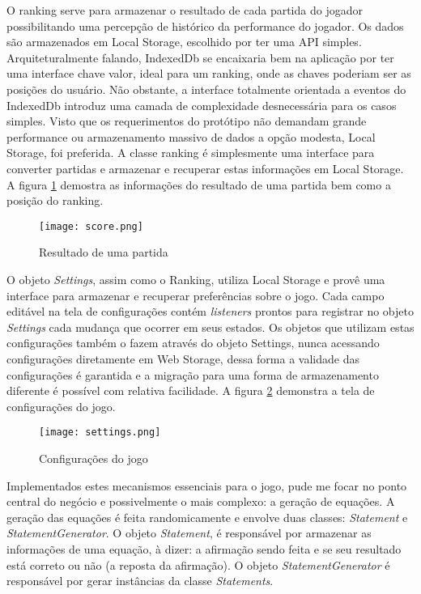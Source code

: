 O ranking serve para armazenar o resultado de cada partida do jogador
possibilitando uma percepção de histórico da performance do jogador.
Os dados são armazenados em Local Storage, escolhido por ter uma API
simples. Arquiteturalmente falando, IndexedDb se encaixaria bem na
aplicação por ter uma interface chave valor, ideal para um ranking,
onde as chaves poderiam ser as posições do usuário. Não obstante,
a interface totalmente orientada a eventos do IndexedDb introduz uma
camada de complexidade desnecessária para os casos simples. Visto que
os requerimentos do protótipo não demandam grande performance ou
armazenamento massivo de dados a opção modesta, Local Storage,
foi preferida. A classe ranking é simplesmente uma interface para
converter partidas e armazenar e recuperar estas informações em Local
Storage. A figura \ref{fig:placar} demostra as informações do resultado
de uma partida bem como a posição do ranking.

\begin{figure}
    \centering
    \texttt{[image: score.png]}
	\caption{Resultado de uma partida}
    \label{fig:placar}
\end{figure}

O objeto \textit{Settings}, assim como o Ranking, utiliza Local Storage
e provê uma interface para armazenar e recuperar preferências sobre
o jogo. Cada campo editável na tela de configurações contém
\textit{listeners} prontos para registrar no objeto \textit{Settings}
cada mudança que ocorrer em seus estados. Os objetos que utilizam estas
configurações também o fazem através do objeto Settings, nunca
acessando configurações diretamente em Web Storage, dessa forma a
validade das configurações é garantida e a migração para uma forma
de armazenamento diferente é possível com relativa facilidade.
A figura \ref{fig:configurations} demonstra a tela de configurações do 
jogo.

\begin{figure}
    \centering
    \texttt{[image: settings.png]}
	\caption{Configurações do jogo}
    \label{fig:configurations}
\end{figure}

Implementados estes mecanismos essenciais para o jogo, pude me focar no
ponto central do negócio e possivelmente o mais complexo: a geração
de equações. A geração das equações é feita randomicamente e
envolve duas classes: \textit{Statement} e \textit{StatementGenerator}.
O objeto \textit{Statement}, é responsável por armazenar as
informações de uma equação, à dizer: a afirmação sendo feita
e se seu resultado está correto ou não (a reposta da afirmação).
O objeto \textit{StatementGenerator} é responsável por gerar
instâncias da classe \textit{Statements}.

